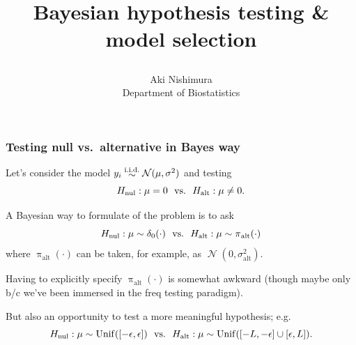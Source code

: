 \documentclass[18pt, handout]{beamer}
\title{%
	\centerline{Bayesian hypothesis testing \& model selection}%
}
\author{%
	Aki Nishimura\\
	Department of Biostatistics%
}
\date{}
\newcommand{\defineTightSpacing}{%
	\setlength{\abovedisplayskip}{.25\baselineskip}%
	\setlength{\belowdisplayskip}{.25\baselineskip}%
}
\newcommand{\iidSim}{\mathrel{\raisebox{-.3ex}{$\overset{\text{i.i.d.}}{\sim}$}}}
\newcommand{\unifDist}{\mathrm{Unif}}
\newcommand{\normalDist}{\operatorname{\mathcal{N}}}
\newcommand{\density}{\operatorname{\pi}}
\newcommand{\hypothesis}{H}
\newcommand{\nullSub}{\mathrm{nul}}
\newcommand{\altSub}{\mathrm{alt}}
\begin{document}
\maketitle


\begin{frame}
\frametitle{Testing null vs.\ alternative in Bayes way}
Let's consider the model $y_i \iidSim \normalDist(\mu, \sigma^2)$ and testing
\begin{equation*} \defineTightSpacing%
\hypothesis_\nullSub: \mu = 0 
	\ \text{ vs.\ } \ 
	\hypothesis_\altSub: \mu \neq 0.
\end{equation*}

A Bayesian way to formulate of the problem is to ask
\begin{equation*} \defineTightSpacing%
\hypothesis_\nullSub: \mu \sim \delta_0(\cdot) 
	\ \text{ vs.\ } \ 
	\hypothesis_\altSub: \mu \sim \density_\altSub(\cdot) 
\end{equation*}
where $\density_\altSub(\cdot)$ can be taken, for example, as $\normalDist(0, \sigma_\altSub^2)$.

\smallskip
Having to explicitly specify $\density_\altSub(\cdot)$ is somewhat awkward (though maybe only b/c we've been immersed in the freq testing paradigm).

But also an opportunity to test a more meaningful hypothesis; e.g.\
\begin{equation*} \defineTightSpacing%
\hypothesis_\nullSub: \mu \sim \unifDist([-\epsilon, \epsilon])
	\ \text{ vs.\ } \ 
	\hypothesis_\altSub: \mu \sim \unifDist([-L, -\epsilon] \cup [\epsilon, L]).
\end{equation*}
\end{frame}
\end{document}
